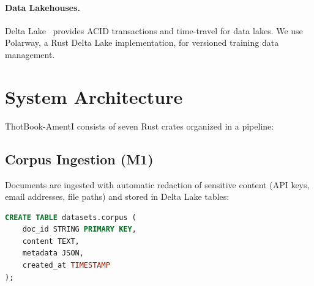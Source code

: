 \documentclass[11pt,a4paper]{article}
\theoremstyle{plain}
\theoremstyle{definition}
\begin{document}
\paragraph{Data Lakehouses.}
Delta Lake~\cite{armbrust2020delta} provides ACID transactions and time-travel
for data lakes. We use Polarway, a Rust Delta Lake implementation, for
versioned training data management.

\section{System Architecture}
\label{sec:architecture}

ThotBook-AmentI consists of seven Rust crates organized in a pipeline:

\begin{center}
\end{center}

\subsection{Corpus Ingestion (M1)}

Documents are ingested with automatic redaction of sensitive content
(API keys, email addresses, file paths) and stored in Delta Lake tables:

\begin{lstlisting}[language=SQL]
CREATE TABLE datasets.corpus (
    doc_id STRING PRIMARY KEY,
    content TEXT,
    metadata JSON,
    created_at TIMESTAMP
);
\end{lstlisting}
\end{document}
